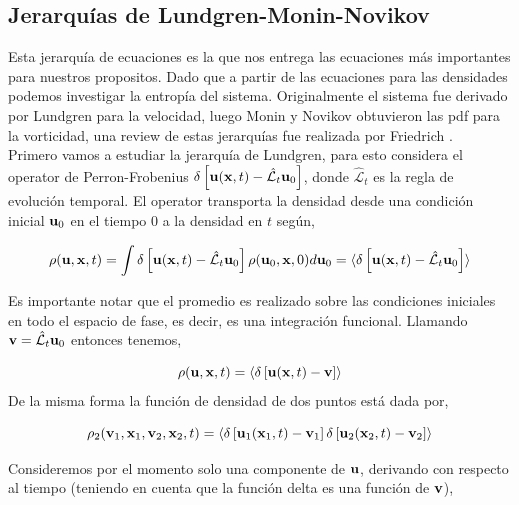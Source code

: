 \documentclass[executivepaper,12pt]{article}
\numberwithin{equation}{section}
\begin{document}
\subsection{Jerarquías de Lundgren-Monin-Novikov}

Esta jerarquía de ecuaciones es la que nos entrega las ecuaciones más importantes para nuestros propositos. Dado que a partir de las ecuaciones para las densidades podemos investigar la entropía del sistema. Originalmente el sistema fue derivado por Lundgren \parencite{lundgren1967} para la velocidad, luego Monin y Novikov obtuvieron las pdf para la vorticidad, una review de estas jerarquías fue realizada por Friedrich \parencite{friedrich2012}. \\

Primero vamos a estudiar la jerarquía de Lundgren, para esto considera el operator de Perron-Frobenius $\delta\left[\vb{u}(\vb{x},t)-\hat{\mathcal{L}}_t \vb{u}_0\right]$, donde $\hat{\mathcal{L}}_t$ es la regla de evolución temporal. El operator transporta la densidad desde una condición inicial  $\vb{u}_0$ en el tiempo $0$ a la densidad en $t$ según,

 \begin{equation*}
 	\rho(\vb{u},\vb{x},t)=\int \delta\left[\vb{u}(\vb{x},t)-\hat{\mathcal{L}}_t \vb{u}_0\right] \rho(\vb{u}_0,\vb{x},0) d\vb{u}_0 = \langle\delta\left[\vb{u}(\vb{x},t)-\hat{\mathcal{L}}_t \vb{u}_0\right]\rangle
 \end{equation*}

Es importante notar que el promedio es realizado sobre las condiciones iniciales en todo el espacio de fase, es decir, es una integración funcional. Llamando $\vb{v}=\hat{\mathcal{L}}_t \vb{u}_0$ entonces tenemos,

\begin{equation*}
	\rho(\vb{u},\vb{x},t)=\langle\delta\left[\vb{u}(\vb{x},t)-\vb{v}\right]\rangle
\end{equation*}
De la misma forma la función de densidad de dos puntos está dada por,

\begin{equation*}
	\rho_2(\vb{v}_1,\vb{x}_1,\vb{v}_2,\vb{x}_2,t)=\langle\delta\left[\vb{u}_1(\vb{x}_1,t)-\vb{v}_1\right]\delta\left[\vb{u}_2(\vb{x}_2,t)-\vb{v}_2\right]\rangle
\end{equation*}

Consideremos por el momento solo una componente de $\vb{u}$, derivando con respecto al tiempo (teniendo en cuenta que la función delta es una función de $\vb{v}$),
\end{document}
